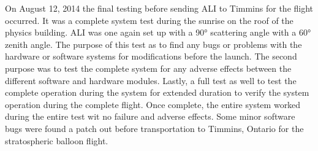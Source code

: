 On August 12, 2014 the final testing before sending ALI to Timmins for the flight occurred. It was a complete system test during the sunrise on the roof of the physics building. ALI was one again set up with a 90\si{\degree} scattering angle with a 60\si{\degree} zenith angle. The purpose of this test as to find any bugs or problems with the hardware or software systems for modifications before the launch. The second purpose was to test the complete system for any adverse effects between the different software and hardware modules. Lastly, a full test as well to test the complete operation during the system for extended duration to verify the system operation during the complete flight. Once complete, the entire system worked during the entire test wit no failure and adverse effects. Some minor software bugs were found a patch out before transportation to Timmins, Ontario for the stratospheric balloon flight.  